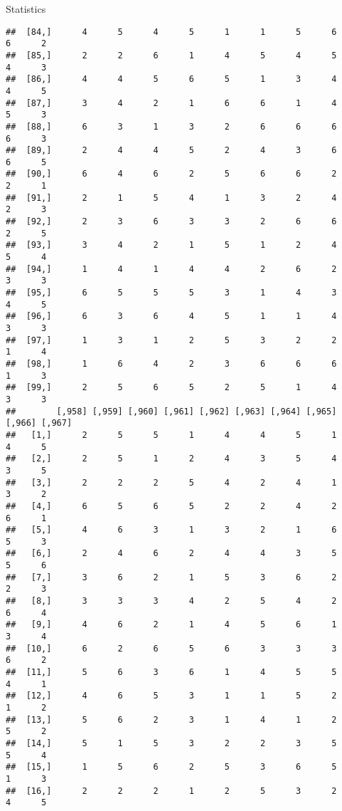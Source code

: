 \documentclass[
  ignorenonframetext,
]{beamer}
\begin{document}
\begin{frame}[fragile]{Statistics}
\begin{verbatim}
##  [84,]      4      5      4      5      1      1      5      6      6      2
##  [85,]      2      2      6      1      4      5      4      5      4      3
##  [86,]      4      4      5      6      5      1      3      4      4      5
##  [87,]      3      4      2      1      6      6      1      4      5      3
##  [88,]      6      3      1      3      2      6      6      6      6      3
##  [89,]      2      4      4      5      2      4      3      6      6      5
##  [90,]      6      4      6      2      5      6      6      2      2      1
##  [91,]      2      1      5      4      1      3      2      4      2      3
##  [92,]      2      3      6      3      3      2      6      6      2      5
##  [93,]      3      4      2      1      5      1      2      4      5      4
##  [94,]      1      4      1      4      4      2      6      2      3      3
##  [95,]      6      5      5      5      3      1      4      3      4      5
##  [96,]      6      3      6      4      5      1      1      4      3      3
##  [97,]      1      3      1      2      5      3      2      2      1      4
##  [98,]      1      6      4      2      3      6      6      6      1      3
##  [99,]      2      5      6      5      2      5      1      4      3      3
##        [,958] [,959] [,960] [,961] [,962] [,963] [,964] [,965] [,966] [,967]
##   [1,]      2      5      5      1      4      4      5      1      4      5
##   [2,]      2      5      1      2      4      3      5      4      3      5
##   [3,]      2      2      2      5      4      2      4      1      3      2
##   [4,]      6      5      6      5      2      2      4      2      6      1
##   [5,]      4      6      3      1      3      2      1      6      5      3
##   [6,]      2      4      6      2      4      4      3      5      5      6
##   [7,]      3      6      2      1      5      3      6      2      2      3
##   [8,]      3      3      3      4      2      5      4      2      6      4
##   [9,]      4      6      2      1      4      5      6      1      3      4
##  [10,]      6      2      6      5      6      3      3      3      6      2
##  [11,]      5      6      3      6      1      4      5      5      4      1
##  [12,]      4      6      5      3      1      1      5      2      1      2
##  [13,]      5      6      2      3      1      4      1      2      5      2
##  [14,]      5      1      5      3      2      2      3      5      5      4
##  [15,]      1      5      6      2      5      3      6      5      1      3
##  [16,]      2      2      2      1      2      5      3      2      4      5

\end{verbatim}
\end{frame}
\end{document}
